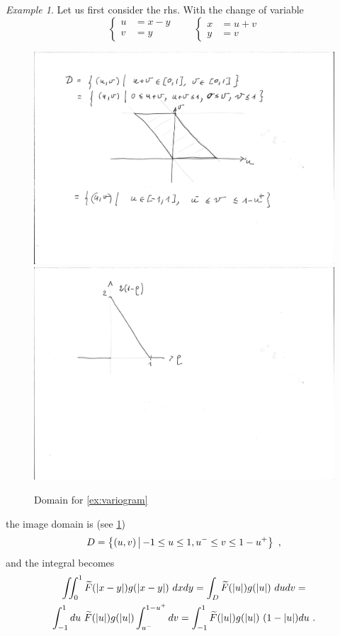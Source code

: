 \documentclass[12pt,a4paper]{amsart}
\theoremstyle{plain}%
\theoremstyle{definition}
\theoremstyle{remark}
\newtheorem{example}{Example}
\begin{document}
\begin{example}
Let us first consider the rhs. With the change of variable
\begin{equation*}
  \begin{cases}
    u  &= x - y \\ v &= y
  \end{cases}
  \qquad
  \begin{cases}
    x &= u + v \\ y &= v 
  \end{cases}
\end{equation*}
\begin{figure}
  \centering
  \includegraphics[height=.25\textheight]{pictures/domain.pdf}
  \includegraphics[height=.25\textheight]{pictures/density.pdf}
  \caption{Domain for \cref{ex:variogram}\label{fig:domain}}
\end{figure}
the image domain is (see \cref{fig:domain})
\begin{equation*}
  D = \left\{(u,v) \, \middle| \, -1 \leq u \leq 1, u^- \leq v \leq 1 - u^+ \right\} \ ,
\end{equation*}
and the integral becomes
\begin{multline*}
  \iint_0^1 \widetilde
  F(\left\vert x-y\right\vert)g(\left\vert x-y\right\vert) \ dx dy = \int_D \widetilde F(\left\vert u\right\vert)
  g(\left\vert u\right\vert) \ du dv = \\ \int_{-1}^1 du \ \widetilde F(\left\vert u\right\vert)
  g(\left\vert u\right\vert) \int_{u^-}^{1-u^+} dv = \int_{-1}^1 \widetilde F(\left\vert u\right\vert)
  g(\left\vert u\right\vert) \ (1-\left\vert u\right\vert) du \ .
\end{multline*}


\end{example}
\end{document}
